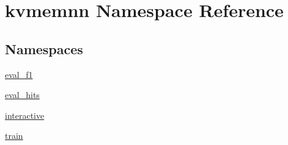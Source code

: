 \hypertarget{namespacekvmemnn}{}\section{kvmemnn Namespace Reference}
\label{namespacekvmemnn}
\subsection*{Namespaces}
\begin{DoxyCompactItemize}
\item 
 \hyperlink{namespacekvmemnn_1_1eval__f1}{eval\+\_\+f1}
\item 
 \hyperlink{namespacekvmemnn_1_1eval__hits}{eval\+\_\+hits}
\item 
 \hyperlink{namespacekvmemnn_1_1interactive}{interactive}
\item 
 \hyperlink{namespacekvmemnn_1_1train}{train}
\end{DoxyCompactItemize}
